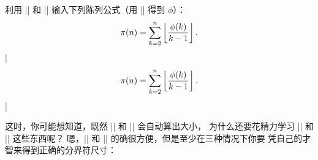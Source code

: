 \exercise 利用 |\left| 和 |\right| 输入下列陈列公式（用 |\phi| 得到 $\phi$）：
$$\pi(n)=\sum_{k=2}^n\left\lfloor\phi(k)\over k-1\right\rfloor.$$
\answer |$$\pi(n)=\sum_{k=2}^n\left\lfloor\phi(k)\over k-1\right\rfloor.$$|

这时，你可能想知道，既然 |\left| 和 |\right| 会自动算出大小，
为什么还要花精力学习 |\bigl| 和 |\bigr| 这些东西呢？
嗯，|\left| 和 |\right| 的确很方便，但是至少在三种情况下你要%
凭自己的才智来得到正确的分界符尺寸：
